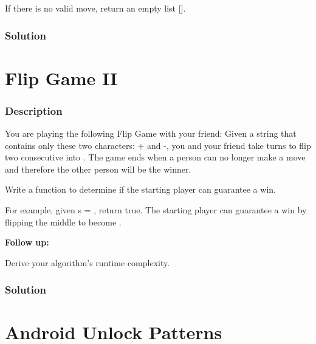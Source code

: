 \begin{Code}
[
  "--++",
  "+--+",
  "++--"
]
\end{Code}

If there is no valid move, return an empty list [].

\subsubsection{Solution}

\begin{Code}

\end{Code}

\newpage

\section{Flip Game II} %
\subsubsection{Description}

You are playing the following Flip Game with your friend: Given a string that contains only these two characters: + and -, you and your friend take turns to flip two consecutive  into . The game ends when a person can no longer make a move and therefore the other person will be the winner.

Write a function to determine if the starting player can guarantee a win.

For example, given s = , return true. The starting player can guarantee a win by flipping the middle  to become .

\textbf{Follow up:}

Derive your algorithm's runtime complexity.

\subsubsection{Solution}

\begin{Code}

\end{Code}

\newpage

\section{Android Unlock Patterns} %
